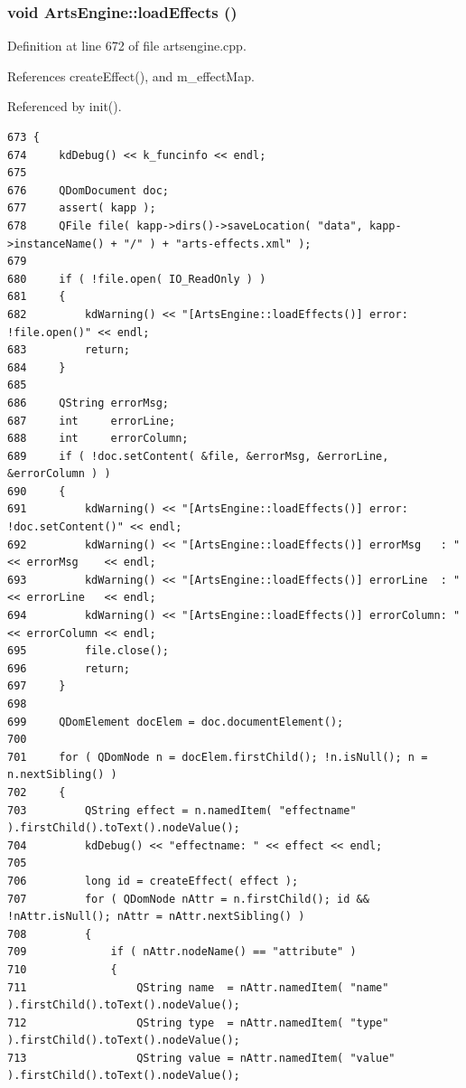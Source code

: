\subsubsection{\setlength{\rightskip}{0pt plus 5cm}void Arts\-Engine::load\-Effects ()\hspace{0.3cm}{\tt  [private]}}\label{classArtsEngine_ArtsEngined2}




Definition at line 672 of file artsengine.cpp.

References create\-Effect(), and m\_\-effect\-Map.

Referenced by init().



\footnotesize\begin{verbatim}673 {
674     kdDebug() << k_funcinfo << endl;
675 
676     QDomDocument doc;
677     assert( kapp );
678     QFile file( kapp->dirs()->saveLocation( "data", kapp->instanceName() + "/" ) + "arts-effects.xml" );
679 
680     if ( !file.open( IO_ReadOnly ) )
681     {
682         kdWarning() << "[ArtsEngine::loadEffects()] error: !file.open()" << endl;
683         return;
684     }
685 
686     QString errorMsg;
687     int     errorLine;
688     int     errorColumn;
689     if ( !doc.setContent( &file, &errorMsg, &errorLine, &errorColumn ) )
690     {
691         kdWarning() << "[ArtsEngine::loadEffects()] error: !doc.setContent()" << endl;
692         kdWarning() << "[ArtsEngine::loadEffects()] errorMsg   : " << errorMsg    << endl;
693         kdWarning() << "[ArtsEngine::loadEffects()] errorLine  : " << errorLine   << endl;
694         kdWarning() << "[ArtsEngine::loadEffects()] errorColumn: " << errorColumn << endl;
695         file.close();
696         return;
697     }
698 
699     QDomElement docElem = doc.documentElement();
700 
701     for ( QDomNode n = docElem.firstChild(); !n.isNull(); n = n.nextSibling() )
702     {
703         QString effect = n.namedItem( "effectname" ).firstChild().toText().nodeValue();
704         kdDebug() << "effectname: " << effect << endl;
705 
706         long id = createEffect( effect );
707         for ( QDomNode nAttr = n.firstChild(); id && !nAttr.isNull(); nAttr = nAttr.nextSibling() )
708         {
709             if ( nAttr.nodeName() == "attribute" )
710             {
711                 QString name  = nAttr.namedItem( "name"  ).firstChild().toText().nodeValue();
712                 QString type  = nAttr.namedItem( "type"  ).firstChild().toText().nodeValue();
713                 QString value = nAttr.namedItem( "value" ).firstChild().toText().nodeValue();

\end{verbatim}
